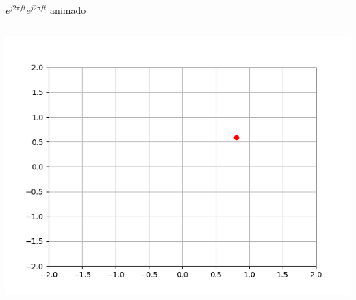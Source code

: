 \begin{frame}[t]{$e^{j2\pi ft}$}{$e^{j2\pi ft}$ animado }
   \handsonicon
   \begin{columns}[onlytextwidth]
      
      \centering\includegraphics[width=1.0\textwidth]{3_clase/euler1}
   \end{columns}
   \vfill
\end{frame}
